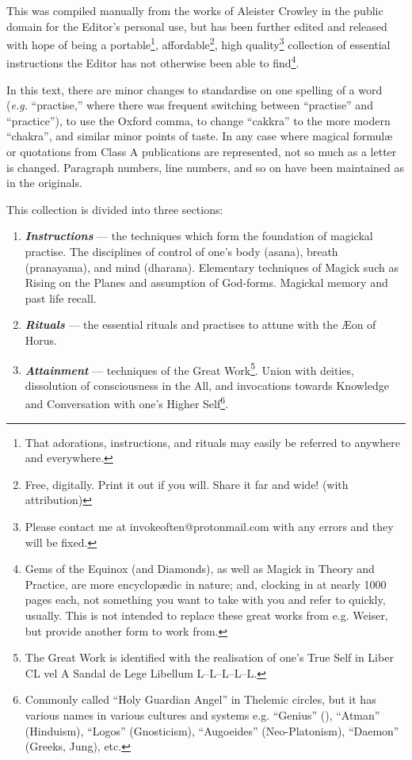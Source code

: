 This was compiled manually from the works of Aleister Crowley in the public domain for the Editor's personal use, but has been further edited and released with hope of being a portable\footnote{That adorations, instructions, and rituals may easily be referred to anywhere and everywhere.}, affordable\footnote{Free\footnotemark, digitally. Print it out if you will. Share it far and wide! (with attribution)}, high quality\footnote{Please contact me at invokeoften@protonmail.com with any errors and they will be fixed.\footnotemark} collection of essential instructions the Editor has not otherwise been able to find\footnote{Gems of the Equinox (and Diamonds), as well as Magick in Theory and Practice, are more encyclop\ae{}dic in nature; and, clocking in at nearly 1000 pages each, not something you want to take with you and refer to quickly, usually. This is not intended to replace these great works from e.g. Weiser, but provide another form to work from.}.

In this text, there are minor changes to standardise on one spelling of a word (\textit{e.g.} \enquote{practise,} where there was frequent switching between \enquote{practise} and \enquote{practice}), to use the Oxford comma, to change \enquote{cakkra} to the more modern \enquote{chakra}, and similar minor points of taste. In any case where magical formul\ae{} or quotations from Class A publications are represented, not so much as a letter is changed. Paragraph numbers, line numbers, and so on have been maintained as in the originals.

This collection is divided into three sections:

\begin{enumerate}[label=\greek*]
\item \textbf{\textit{Instructions}} --- the techniques which form the foundation of magickal practise. The disciplines of control of one's body (asana), breath (pranayama), and mind (dharana). Elementary techniques of Magick such as Rising on the Planes and assumption of God-forms. Magickal memory and past life recall.
\item \textbf{\textit{Rituals}} --- the essential rituals and practises to attune with the \AE{}on of Horus.
\item \textbf{\textit{Attainment}} --- techniques of the Great Work\footnote{The Great Work is identified with the realisation of one's True Self in Liber CL vel  A Sandal de Lege Libellum L--L--L--L--L.}. Union with deities, dissolution of consciousness in the All, and invocations towards Knowledge and Conversation with one's Higher Self\footnote{Commonly called \enquote{Holy Guardian Angel} in Thelemic circles, but it has various names in various cultures and systems e.g. \enquote{Genius} (\GD{}), \enquote{Atman} (Hinduism), \enquote{Logos} (Gnosticism), \enquote{Augoeides} (Neo-Platonism), \enquote{Daemon} (Greeks, Jung), etc.}.
\end{enumerate}

